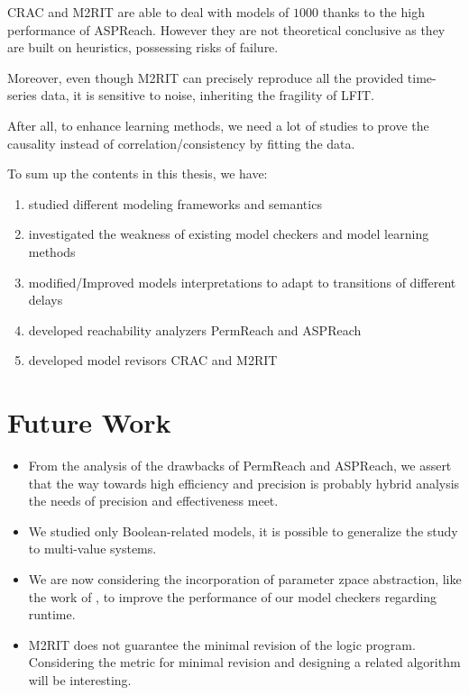 CRAC and M2RIT are able to deal with models of $1000$ thanks to the high performance of ASPReach.
However they are not theoretical conclusive as they are built on heuristics, possessing risks of failure.

Moreover, even though M2RIT can precisely reproduce all the provided time-series data, it is sensitive to noise, inheriting the fragility of LFIT.

After all, to enhance learning methods, we need a lot of studies to prove the causality instead of correlation/consistency by fitting the data.

To sum up the contents in this thesis, we have:

\begin{enumerate}
    \item studied different modeling frameworks and semantics
    \item investigated the weakness of existing model checkers and model learning methods
    \item modified/Improved models interpretations to adapt to transitions of different delays
    \item developed reachability analyzers PermReach and ASPReach
    \item developed model revisors CRAC and M2RIT
\end{enumerate}

\section{Future Work}

\begin{itemize}
    \item From the analysis of the drawbacks of PermReach and ASPReach, we assert that the way towards high efficiency and precision is probably hybrid analysis the needs of precision and effectiveness meet.

    \item We studied only Boolean-related models, it is possible to generalize the study to multi-value systems.
    \item We are now considering the incorporation of parameter zpace abstraction, like the work of \cite{PRNs-TCS18}, to
    improve the performance of our model checkers regarding runtime.
    \item M2RIT does not guarantee the minimal revision of the logic program.
    Considering the metric for minimal revision and designing a related algorithm will be interesting.
\end{itemize}
